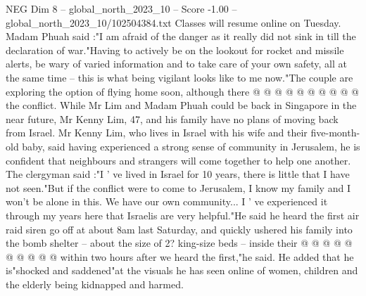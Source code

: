 \begin{textsample}{NEG Dim 8 – global\_north\_2023\_10 – Score -1.00 – global\_north\_2023\_10/102504384.txt}
Classes will resume online on Tuesday.
Madam Phuah said :"I am afraid of the danger as it really did not sink in till the declaration of war."Having to actively be on the lookout for rocket and missile alerts, be wary of varied information and to take care of your own safety, all at the same time -- this is what being vigilant looks like to me now."The couple are exploring the option of flying home soon, although there @ @ @ @ @ @ @ @ @ @ the conflict.
While Mr Lim and Madam Phuah could be back in Singapore in the near future, Mr Kenny Lim, 47, and his family have no plans of moving back from Israel.
Mr Kenny Lim, who lives in Israel with his wife and their five-month-old baby, said having experienced a strong sense of community in Jerusalem, he is confident that neighbours and strangers will come together to help one another.
The clergyman said :"I ' ve lived in Israel for 10 years, there is little that I have not seen."But if the conflict were to come to Jerusalem, I know my family and I won't be alone in this.
We have our own community...
I ' ve experienced it through my years here that Israelis are very helpful."He said he heard the first air raid siren go off at about 8am last Saturday, and quickly ushered his family into the bomb shelter -- about the size of 2? king-size beds -- inside their @ @ @ @ @ @ @ @ @ @ within two hours after we heard the first,"he said.
He added that he is"shocked and saddened"at the visuals he has seen online of women, children and the elderly being kidnapped and harmed.

\end{textsample}
